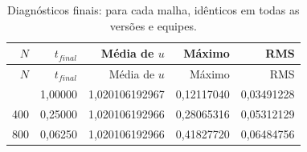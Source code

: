 \begin{longtable}{rrrrr}
\caption{Diagnósticos finais: para cada malha, idênticos em todas as versões e equipes.}\label{tab:diagnosticos}\\
\toprule $N$ & $t_{final}$ & Média de $u$ & Máximo & RMS\\
\midrule\endfirsthead
\toprule $N$ & $t_{final}$ & Média de $u$ & Máximo & RMS\\
\midrule\endhead
\bottomrule\endfoot
200 & 1,00000 & 1,020106192967 & 0,12117040 & 0,03491228\\
400 & 0,25000 & 1,020106192966 & 0,28065316 & 0,05312129\\
800 & 0,06250 & 1,020106192966 & 0,41827720 & 0,06484756\\
\end{longtable}
